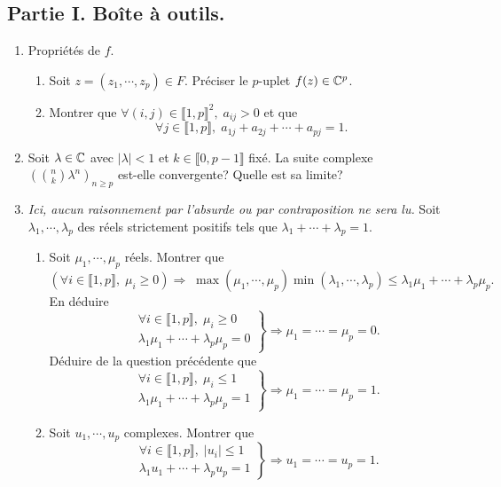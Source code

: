 \subsection*{Partie I. Boîte à outils.}
\begin{enumerate}
 \item Propriétés de $f$.
 \begin{enumerate}
   \item Soit $z=(z_1,\cdots,z_p) \in F$. Préciser le $p$-uplet $f(z) \in \mathbb{C}^p$.
   \item Montrer que $\forall (i,j) \in \llbracket 1,p \rrbracket^2, \; a_{ij} > 0$ et que
\[
\forall j \in \llbracket 1,p \rrbracket,\; a_{1j} + a_{2j} + \cdots + a_{pj} = 1.  
\]
 \end{enumerate}


  \item  Soit $\lambda \in \mathbb{C}$ avec $|\lambda| < 1$ et $k \in \llbracket 0, p-1\rrbracket$ fixé. La suite complexe $\left(\binom{n}{k}\lambda^n\right) _{n\geq p}$ est-elle convergente? Quelle est sa limite?
  
 \item \emph{Ici, aucun raisonnement par l'absurde ou par contraposition ne sera lu.}\newline  
 Soit $\lambda_1, \cdots, \lambda_p$ des réels strictement positifs tels que $\lambda_1 + \cdots + \lambda_p =1$.
\begin{enumerate}
 \item Soit $\mu_1,\cdots,\mu_p$ réels. Montrer que
\[
  \left(\forall i \in \llbracket 1,p \rrbracket,\; \mu_i \geq 0\right)
  \Rightarrow \; \max(\mu_1,\cdots,\mu_p) \min(\lambda_1, \cdots, \lambda_p) \leq \lambda_1 \mu_1 + \cdots + \lambda_p \mu_p.
\]
En déduire 
\[
 \left.
 \begin{aligned}
  &\forall i\in\llbracket1,p\rrbracket,\; \mu_i\geq 0 \\ 
  &\lambda_1 \mu_1 + \cdots +\lambda_p \mu_p = 0
 \end{aligned}
\right\rbrace  \Rightarrow \mu_1 = \cdots = \mu_p = 0. 
\]
Déduire de la question précédente que 
\[
 \left.
 \begin{aligned}
  &\forall i\in\llbracket1,p\rrbracket,\; \mu_i\leq 1 \\
  &\lambda_1 \mu_1 + \cdots +\lambda_p \mu_p = 1
 \end{aligned}
 \right\rbrace  \Rightarrow \mu_1 = \cdots = \mu_p = 1 .
\] 

  \item Soit $u_1,\cdots,u_p$ complexes. Montrer que
\[
  \left.
  \begin{aligned}
    &\forall i\in\llbracket1,p\rrbracket,\; |u_i| \leq 1 \\
    &\lambda_1 u_1 + \cdots +\lambda_p u_p = 1
  \end{aligned}
  \right\rbrace 
  \Rightarrow u_1 = \cdots = u_p = 1 .
\]
\end{enumerate}

\end{enumerate}

